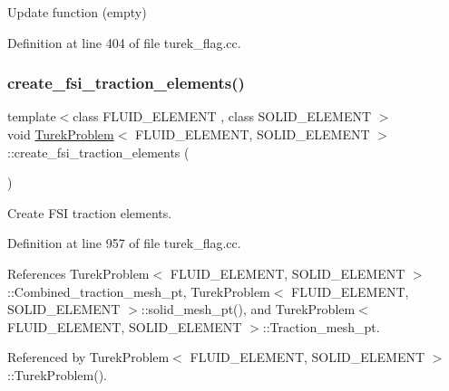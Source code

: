 Update function (empty) 



Definition at line 404 of file turek\+\_\+flag.\+cc.

\mbox{\label{classTurekProblem_ad460a2e860c9425297cf70ee125de10b}} 
\subsubsection{\texorpdfstring{create\+\_\+fsi\+\_\+traction\+\_\+elements()}{create\_fsi\_traction\_elements()}}
{\footnotesize\ttfamily template$<$class F\+L\+U\+I\+D\+\_\+\+E\+L\+E\+M\+E\+NT , class S\+O\+L\+I\+D\+\_\+\+E\+L\+E\+M\+E\+NT $>$ \\
void \hyperlink{classTurekProblem}{Turek\+Problem}$<$ F\+L\+U\+I\+D\+\_\+\+E\+L\+E\+M\+E\+NT, S\+O\+L\+I\+D\+\_\+\+E\+L\+E\+M\+E\+NT $>$\+::create\+\_\+fsi\+\_\+traction\+\_\+elements (\begin{DoxyParamCaption}{ }\end{DoxyParamCaption})\hspace{0.3cm}{\ttfamily [private]}}



Create F\+SI traction elements. 



Definition at line 957 of file turek\+\_\+flag.\+cc.



References Turek\+Problem$<$ F\+L\+U\+I\+D\+\_\+\+E\+L\+E\+M\+E\+N\+T, S\+O\+L\+I\+D\+\_\+\+E\+L\+E\+M\+E\+N\+T $>$\+::\+Combined\+\_\+traction\+\_\+mesh\+\_\+pt, Turek\+Problem$<$ F\+L\+U\+I\+D\+\_\+\+E\+L\+E\+M\+E\+N\+T, S\+O\+L\+I\+D\+\_\+\+E\+L\+E\+M\+E\+N\+T $>$\+::solid\+\_\+mesh\+\_\+pt(), and Turek\+Problem$<$ F\+L\+U\+I\+D\+\_\+\+E\+L\+E\+M\+E\+N\+T, S\+O\+L\+I\+D\+\_\+\+E\+L\+E\+M\+E\+N\+T $>$\+::\+Traction\+\_\+mesh\+\_\+pt.



Referenced by Turek\+Problem$<$ F\+L\+U\+I\+D\+\_\+\+E\+L\+E\+M\+E\+N\+T, S\+O\+L\+I\+D\+\_\+\+E\+L\+E\+M\+E\+N\+T $>$\+::\+Turek\+Problem().

\mbox{\label{classTurekProblem_a2cf0eb1610b4c3a7cdbd3c7948cdd46e}} 
